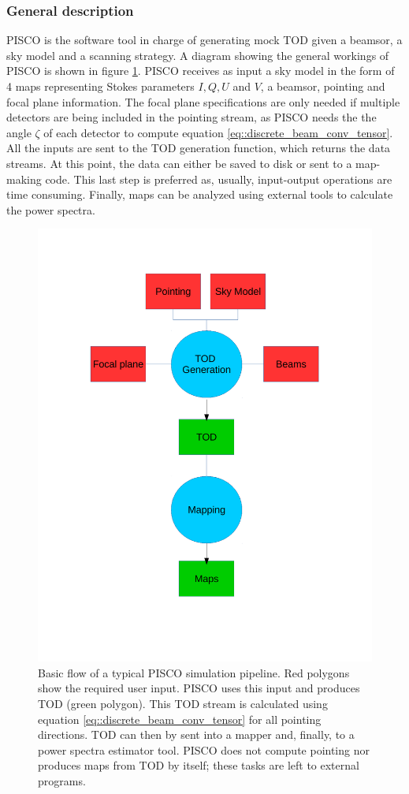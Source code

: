 \documentclass[a4paper,11pt]{article}
\begin{document}
\subsubsection{General description}

PISCO is the software tool in charge of generating mock TOD given a beamsor, a sky model and a scanning strategy. A diagram showing the general workings of PISCO is shown in figure \ref{fig::pisco_flow}. PISCO receives as input a sky model in the form of 4 maps representing Stokes parameters $I,Q,U$ and $V$, a beamsor, pointing and focal plane information. The focal plane specifications are only needed if multiple detectors are being included in the pointing stream, as PISCO needs the the angle $\zeta$ of each detector to compute equation \ref{eq::discrete_beam_conv_tensor}. All the inputs are sent to the TOD generation function, which returns the data streams. At this point, the data can either be saved to disk or sent to a map-making code. This last step is preferred as, usually, input-output operations are time consuming. Finally, maps can be analyzed using external tools to calculate the power spectra.

\begin{figure}
	\centering
	\includegraphics[width=0.6\linewidth]{figures/pisco-flow-diagram}
	\caption{Basic flow of a typical PISCO simulation pipeline. Red polygons show the required user input. PISCO uses this input and produces TOD (green polygon). This TOD stream is calculated using equation \ref{eq::discrete_beam_conv_tensor} for all pointing directions. TOD can then by sent into a mapper and, finally, to a power spectra estimator tool. PISCO does not compute pointing nor produces maps from TOD by itself; these tasks are left to external programs.}
	\label{fig::pisco_flow}
\end{figure}
\end{document}
